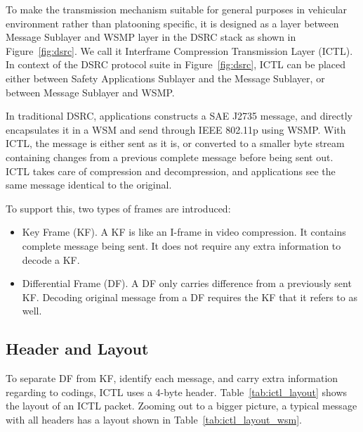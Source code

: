 \documentclass[12pt]{report}
\begin{document}
To make the transmission mechanism suitable for general purposes in vehicular environment rather than platooning specific, it is designed as a layer between Message Sublayer and WSMP layer in the DSRC stack as shown in Figure~\ref{fig:dsrc}. We call it Interframe Compression Transmission Layer (ICTL). In context of the DSRC protocol suite in Figure~\ref{fig:dsrc}, ICTL can be placed either between Safety Applications Sublayer and the Message Sublayer, or between Message Sublayer and WSMP.

In traditional DSRC, applications constructs a SAE J2735 message, and directly encapsulates it in a WSM and send through IEEE 802.11p using WSMP. With ICTL, the message is either sent as it is, or converted to a smaller byte stream containing changes from a previous complete message before being sent out. ICTL takes care of compression and decompression, and applications see the same message identical to the original.

To support this, two types of frames are introduced:

\begin{itemize}
  \item Key Frame (KF). A KF is like an I-frame in video compression. It contains complete message being sent. It does not require any extra information to decode a KF.
  \item Differential Frame (DF). A DF only carries difference from a previously sent KF. Decoding original message from a DF requires the KF that it refers to as well.
\end{itemize}

\subsection{Header and Layout}

To separate DF from KF, identify each message, and carry extra information regarding to codings, ICTL uses a 4-byte header. Table~\ref{tab:ictl_layout} shows the layout of an ICTL packet. Zooming out to a bigger picture, a typical message with all headers has a layout shown in Table~\ref{tab:ictl_layout_wsm}.
\end{document}
